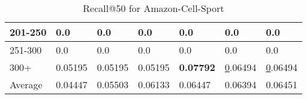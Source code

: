\begin{table*}[]
\begin{tabular}{|l|l|l|l|l|l|l|}
    201-250   & 0.0                            & 0.0                            & 0.0                            & 0.0                            & 0.0                            & 0.0                            \\ \hline
    251-300   & 0.0                            & 0.0                            & 0.0                            & 0.0                            & 0.0                            & 0.0                            \\ \hline
    300+      & 0.05195                        & 0.05195                        & 0.05195                        & \textbf{0.07792}               & {\ul 0.06494}                  & {\ul 0.06494}                  \\ \hline
    Average   & 0.04447                        & 0.05503                        & 0.06133                        & 0.06447                        & 0.06394                        & 0.06451                        \\ \hline   
    \end{tabular}
    \caption{Recall@50 for Amazon-Cell-Sport}
    \label{tab:Amazon-Cell-Sport-recall-evaluation}
\end{table*}
